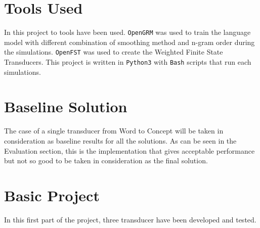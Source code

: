 \documentclass[11pt,a4paper]{article}
\begin{document}
\section{Tools Used}
In this project to tools have been used. \texttt{OpenGRM} was used to train the language model with different combination of smoothing method and n-gram order during the simulations.
\texttt{OpenFST} was used to create the Weighted Finite State Transducers.
This project is written in \texttt{Python3} with \texttt{Bash} scripts that run each simulations.

\section{Baseline Solution}
\label{baseline}
The case of a single transducer from Word to Concept will be taken in consideration as baseline results for all the solutions. As can be seen in the Evaluation section, this is the implementation that gives acceptable performance but not so good to be taken in consideration as the final solution.

\section{Basic Project}
In this first part of the project, three transducer have been developed and tested.
\end{document}
